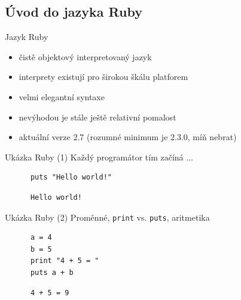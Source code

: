 \documentclass{beamer}
\begin{document}
\subsection{Úvod do jazyka Ruby}

\begin{frame}{Jazyk Ruby}
  \begin{itemize}
    \item čistě objektový interpretovaný jazyk
    \item interprety existují pro širokou škálu platforem
    \item velmi elegantní syntaxe
    \item nevýhodou je stále ještě relativní pomalost
    \item aktuální verze 2.7 (rozumné minimum je 2.3.0, míň nebrat)
  \end{itemize}
\end{frame}

\begin{frame}[fragile]{Ukázka Ruby (1)}
  Každý programátor tím začíná ...
  \begin{block}{}
    \smallskip \footnotesize
    {\scriptsize \begin{verbatim}
      puts "Hello world!"
    \end{verbatim}}
  \end{block}
  \pause
  \begin{block}{}
    \smallskip \footnotesize
    {\scriptsize \begin{verbatim}
      Hello world!
    \end{verbatim}}
  \end{block}
\end{frame}

\begin{frame}[fragile]{Ukázka Ruby (2)}
  Proměnné, \texttt{print} vs. \texttt{puts}, aritmetika
  \begin{block}{}
    \smallskip \footnotesize
    {\scriptsize \begin{verbatim}
      a = 4
      b = 5
      print "4 + 5 = "
      puts a + b
    \end{verbatim}}
  \end{block}
  \pause
  \begin{block}{}
    \smallskip \footnotesize
    {\scriptsize \begin{verbatim}
      4 + 5 = 9
    \end{verbatim}}
  \end{block}
\end{frame}
\end{document}
